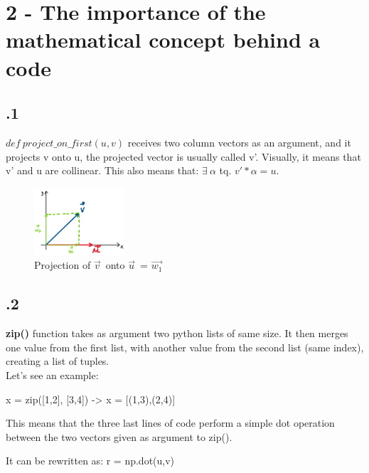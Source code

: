 \documentclass[a4paper]{article}
\begin{document}
\section*{2 - The importance of the mathematical concept behind a code}
\subsection*{.1}
\textbf{$def \ project\_on\_first(u, v)$} receives two column vectors as an argument, and it projects v onto u, the projected vector is usually called v'. Visually, it means that v' and u are collinear. This also means that: $\exists\ \alpha$ tq. $v'*\alpha = u$.
\begin{figure}[H]
\center
\includegraphics[width=0.3\textwidth]{images/projection.PNG}
\caption{Projection of $\vec{v}^{\,}$ onto $\vec{u}^{\,}$ = $\vec{w_{1}}^{\,}$}
\end{figure}
\subsection*{.2}
\textbf{zip()} function takes as argument two python lists of same size. It then merges one value from the first list, with another value from the second list (same index), creating a list of tuples. \\
Let's see an example:
\begin{center}
x = zip([1,2], [3,4]) -> x = [(1,3),(2,4)]
\end{center}
This means that the three last lines of code perform a simple dot operation between the two vectors given as argument to zip().
\begin{center}
It can be rewritten as: r = np.dot(u,v)
\end{center}
\end{document}
